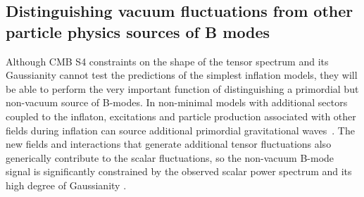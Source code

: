 \subsection{Distinguishing vacuum fluctuations from other particle physics sources of B modes}
\label{subsec:nonvac}
Although CMB S4 constraints on the shape of the tensor spectrum and its Gaussianity cannot test the predictions of the simplest inflation models, they will be able to perform the very important function of distinguishing a primordial but non-vacuum source of B-modes. In non-minimal models with additional sectors coupled to the inflaton, excitations and particle production associated with other fields during inflation can source additional primordial gravitational waves~\cite{Cook:2011hg,Senatore:2011sp,Barnaby:2012xt}. The new fields and interactions that generate additional tensor fluctuations also generically contribute to the scalar fluctuations, so the non-vacuum B-mode signal is significantly constrained by the observed scalar power spectrum and its high degree of Gaussianity \cite{Barnaby:2012xt,Meerburg:2012id,Ferreira:2014zia,Mirbabayi:2014jqa,Ozsoy:2014sba}. 


%


